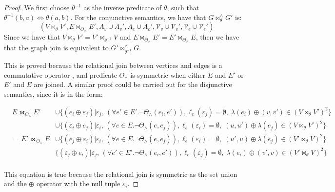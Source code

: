 \begin{proof}
We first choose $\theta^{-1}$ as the inverse predicate of $\theta$, such that $\theta^{-1}(b,a)\Leftrightarrow \theta(a,b)$. For the conjunctive semantics, we have that $G\bowtie_\theta^\wedge G'$ is:
	\[(V\bowtie_\theta V',E\bowtie_{\Theta_\wedge}E', A_v\cup A_v',A_e\cup A_e',\mathcal{V}_v\cup \mathcal{V}_v',\mathcal{V}_e\cup \mathcal{V}_e')\]
	Since we have that $V\bowtie_\theta V'=V'\bowtie_{\theta^{-1}} V$ and
	$E\bowtie_{\Theta_\wedge}E'=E'\bowtie_{\Theta_\wedge}E$, then we have that
	the graph join is equivalent to $G'\bowtie_{\theta^{-1}}^\wedge G$.

	This is proved because the relational join between vertices and edges is  a commutative operator
	\cite{Rolleke94equivalencesof}, and predicate $\Theta_\wedge$  is symmetric
	when either $E$ and $E'$ or $E'$ and $E$ are joined. A similar proof could be carried out for
	the disjunctive semantics, since it is in the form:

	\begin{align*}
	\label{eq:disj}
	&E\fullouterjoin_{\Theta_\wedge}E'&\cup\{(e_i\oplus\varepsilon_j)|\varepsilon_j,\,\left(\forall e'\in E'. \neg\Theta_\wedge(e_i,e')\right), \ell_e(\varepsilon_j)=\emptyset,\;\lambda(e_i)\oplus (v,v')\in (V\bowtie_\theta V')^2  \}\\
	& & \cup\{(\varepsilon_i\oplus e_j)|\varepsilon_i,\,\left(\forall e\in E. \neg\Theta_\wedge(e,e_j)\right), \ell_e(\varepsilon_i)=\emptyset,\;(u,u')\oplus \lambda(e_j)\in (V\bowtie_\theta V')^2  \}\quad \\
	&= E'\fullouterjoin_{\Theta_\wedge}E& \cup\{(e_j\oplus \varepsilon_i)|\varepsilon_i,\,\left(\forall e\in E. \neg\Theta_\wedge(e,e_j)\right), \ell_e(\varepsilon_i)=\emptyset,\;(u',u)\oplus \lambda(e_j)\in (V'\bowtie_\theta V)^2  \}\quad \\
	& & \{(\varepsilon_j\oplus e_i)|\varepsilon_j,\,\left(\forall e'\in E'. \neg\Theta_\wedge(e_i,e')\right), \ell_e(\varepsilon_j)=\emptyset,\;\lambda(e_i)\oplus (v',v)\in (V'\bowtie_\theta V)^2  \}\\
	&
	\end{align*}

This equation is true because the relational join is symmetric
	as the set union and the $\oplus$ operator with the null tuple $\varepsilon_i$.
\end{proof}


